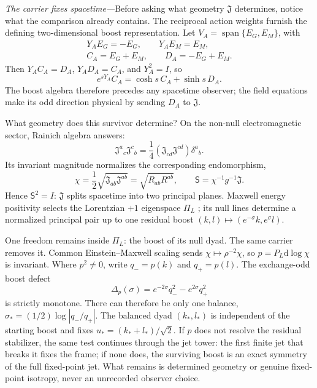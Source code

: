 \documentclass[aps,prl,reprint]{revtex4-2}
\newcommand{\dd}{\mathrm d}
\newcommand{\spanop}{\operatorname{span}}
\begin{document}
\textit{The carrier fixes spacetime---}Before asking what geometry $\mathfrak J$ determines, notice what the comparison already contains. The reciprocal action weights furnish the defining two-dimensional boost representation. Let $V_A=\spanop\{E_G,E_M\}$, with
\begin{equation}
\begin{gathered}
Y_AE_G=-E_G,\qquad Y_AE_M=E_M,\\
C_A=E_G+E_M,\qquad D_A=-E_G+E_M.
\end{gathered}
\label{eq:actionmodule}
\end{equation}
Then $Y_AC_A=D_A$, $Y_AD_A=C_A$, and $Y_A^2=I$, so
\begin{equation}
e^{sY_A}C_A=\cosh s\,C_A+\sinh s\,D_A .
\label{eq:actionboost}
\end{equation}
The boost algebra therefore precedes any spacetime observer; the field equations make its odd direction physical by sending $D_A$ to $\mathfrak J$.

What geometry does this survivor determine? On the non-null electromagnetic sector, Rainich algebra answers:
\begin{equation}
\mathfrak J^a{}_c\mathfrak J^c{}_b
=\frac14\left(\mathfrak J_{cd}\mathfrak J^{cd}\right)\delta^a{}_b .
\label{eq:rainich}
\end{equation}
Its invariant magnitude normalizes the corresponding endomorphism,
\begin{equation}
\chi=\frac12\sqrt{\mathfrak J_{ab}\mathfrak J^{ab}}
=\sqrt{R_{ab}R^{ab}},
\qquad
\mathsf S=\chi^{-1}g^{-1}\mathfrak J.
\label{eq:chiS}
\end{equation}
Hence $\mathsf S^2=I$: $\mathfrak J$ splits spacetime into two principal planes. Maxwell energy positivity selects the Lorentzian $+1$ eigenspace $\Pi_L$ \cite{MisnerWheeler,WittenRainich}; its null lines determine a normalized principal pair up to one residual boost $(k,l)\mapsto(e^{-\sigma}k,e^{\sigma}l)$.

One freedom remains inside $\Pi_L$: the boost of its null dyad. The same carrier removes it. Common Einstein--Maxwell scaling sends $\chi\mapsto\rho^{-2}\chi$, so $p=P_L\dd\log\chi$ is invariant. Where $p^2\neq0$, write $q_-=p(k)$ and $q_+=p(l)$. The exchange-odd boost defect
\begin{equation}
\Delta_p(\sigma)=e^{-2\sigma}q_-^2-e^{2\sigma}q_+^2
\label{eq:boostdefect}
\end{equation}
is strictly monotone. There can therefore be only one balance,
$\sigma_*=(1/2)\log|q_-/q_+|$. The balanced dyad $(k_*,l_*)$ is independent of the starting boost and fixes $u_*=(k_*+l_*)/\sqrt2$. If $p$ does not resolve the residual stabilizer, the same test continues through the jet tower: the first finite jet that breaks it fixes the frame; if none does, the surviving boost is an exact symmetry of the full fixed-point jet. What remains is determined geometry or genuine fixed-point isotropy, never an unrecorded observer choice.
\end{document}
